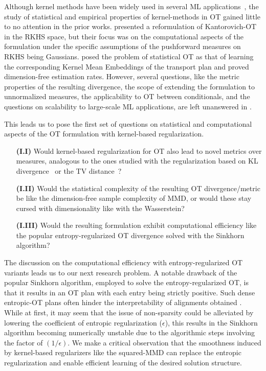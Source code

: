 Although kernel methods have been widely used in several ML applications~\citep{Hofmann_2008, gretton12a,Li17,Li21,nguyen20, kernelaistats22, kernelicml23, kernelicml24}, the study of statistical and empirical properties of kernel-methods in OT gained little to no attention in the prior works. \cite{zhangotkernel19} presented a reformulation of Kantorovich-OT in the RKHS space, but their focus was on the computational aspects of the formulation under the specific assumptions of the pushforward measures on RKHS being Gaussians. \cite{ot-kme} posed the problem of statistical OT as that of learning the corresponding Kernel Mean Embeddings of the transport plan and proved dimension-free estimation rates. However, several questions, like the metric properties of the resulting divergence, the scope of extending the formulation to unnormalized measures, the applicability to OT between conditionals, and the questions on scalability to large-scale ML applications, are left unanswered in \cite{ot-kme}.

This leads us to pose the first set of questions on statistical and computational aspects of the OT formulation with kernel-based regularization.
\begin{definitionBoxIntro}
\begin{enumerate}[labelwidth=1em, leftmargin=1em, align=left]
    \item[\textbf{(I.I)}] Would kernel-based regularization for OT also lead to novel metrics over measures, analogous to the ones studied with the regularization based on KL divergence~\citep{Liero2018} or the TV distance~\citep{Piccoli2014GeneralizedWD}?
    \item[\textbf{(I.II)}] Would the statistical complexity of the resulting OT divergence/metric be like the dimension-free sample complexity of MMD, or would these stay cursed with dimensionality like with the Wasserstein?
    \item[\textbf{(I.III)}] Would the resulting formulation exhibit computational efficiency like the popular entropy-regularized OT divergence solved with the Sinkhorn algorithm?
\end{enumerate}
\end{definitionBoxIntro}
The discussion on the computational efficiency with entropy-regularized OT variants leads us to our next research problem. A notable drawback of the popular Sinkhorn algorithm, employed to solve the entropy-regularized OT, is that it results in an OT plan with each entry being strictly positive. Such dense entropic-OT plans often hinder the interpretability of alignments obtained \citep{swanson-etal-2020-rationalizing}. While at first, it may seem that the issue of non-sparsity could be alleviated by lowering the coefficient of entropic regularization ($\epsilon$), this results in the Sinkhorn algorithm becoming numerically unstable \citep[Remark (4.7)]{peyre2019computational} due to the algorithmic steps involving the factor of $(1/\epsilon)$. We make a critical observation that the smoothness induced by kernel-based regularizers like the squared-MMD can replace the entropic regularization and enable efficient learning of the desired solution structure.

